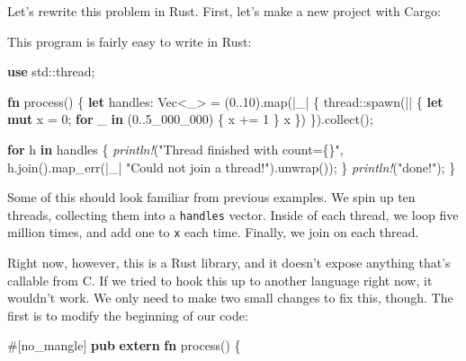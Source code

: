 \documentclass[a4paper,]{book}
\newenvironment{Shaded}{\begin{snugshade}}{\end{snugshade}}
\newcommand{\KeywordTok}[1]{\textcolor[rgb]{0.13,0.29,0.53}{\textbf{{#1}}}}
\newcommand{\DataTypeTok}[1]{\textcolor[rgb]{0.13,0.29,0.53}{{#1}}}
\newcommand{\DecValTok}[1]{\textcolor[rgb]{0.00,0.00,0.81}{{#1}}}
\newcommand{\StringTok}[1]{\textcolor[rgb]{0.31,0.60,0.02}{{#1}}}
\newcommand{\PreprocessorTok}[1]{\textcolor[rgb]{0.56,0.35,0.01}{\textit{{#1}}}}
\newcommand{\AttributeTok}[1]{\textcolor[rgb]{0.77,0.63,0.00}{{#1}}}
\newcommand{\NormalTok}[1]{{#1}}
\begin{document}
Let's rewrite this problem in Rust. First, let's make a new project with
Cargo:

\begin{Shaded}
\end{Shaded}

This program is fairly easy to write in Rust:

\begin{Shaded}
\begin{Highlighting}[]
\KeywordTok{use} \NormalTok{std::thread;}

\KeywordTok{fn} \NormalTok{process() \{}
    \KeywordTok{let} \NormalTok{handles: }\DataTypeTok{Vec}\NormalTok{<_> = (}\DecValTok{0.}\NormalTok{.}\DecValTok{10}\NormalTok{).map(|_| \{}
        \NormalTok{thread::spawn(|| \{}
            \KeywordTok{let} \KeywordTok{mut} \NormalTok{x = }\DecValTok{0}\NormalTok{;}
            \KeywordTok{for} \NormalTok{_ }\KeywordTok{in} \NormalTok{(}\DecValTok{0.}\NormalTok{.}\DecValTok{5_000_000}\NormalTok{) \{}
                \NormalTok{x += }\DecValTok{1}
            \NormalTok{\}}
        \NormalTok{x}
        \NormalTok{\})}
    \NormalTok{\}).collect();}

    \KeywordTok{for} \NormalTok{h }\KeywordTok{in} \NormalTok{handles \{}
        \PreprocessorTok{println!}\NormalTok{(}\StringTok{"Thread finished with count=\{\}"}\NormalTok{,}
        \NormalTok{h.join().map_err(|_| }\StringTok{"Could not join a thread!"}\NormalTok{).unwrap());}
    \NormalTok{\}}
    \PreprocessorTok{println!}\NormalTok{(}\StringTok{"done!"}\NormalTok{);}
\NormalTok{\}}
\end{Highlighting}
\end{Shaded}

Some of this should look familiar from previous examples. We spin up ten
threads, collecting them into a \texttt{handles} vector. Inside of each
thread, we loop five million times, and add one to \texttt{x} each time.
Finally, we join on each thread.

Right now, however, this is a Rust library, and it doesn't expose
anything that's callable from C. If we tried to hook this up to another
language right now, it wouldn't work. We only need to make two small
changes to fix this, though. The first is to modify the beginning of our
code:

\begin{Shaded}
\begin{Highlighting}[]
\AttributeTok{#[}\NormalTok{no_mangle}\AttributeTok{]}
\KeywordTok{pub} \KeywordTok{extern} \KeywordTok{fn} \NormalTok{process() \{}
\end{Highlighting}
\end{Shaded}
\end{document}
